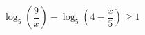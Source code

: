\begin{ex}[type=inequality]
	\begin{condition}
		\( \log_5\left( \dfrac{9}{x} \right)-\log_5\left( 4-\dfrac{x}{5} \right)\ge1 \)
	\end{condition}
	\answer{\( [-3;0)\cup[3;20) \)}
\end{ex}